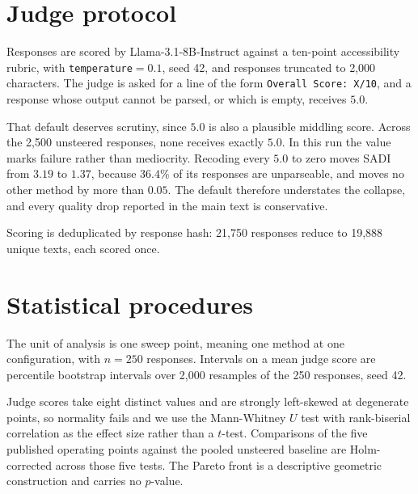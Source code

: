 
\section{Judge protocol}
\label{app:judge}

Responses are scored by Llama-3.1-8B-Instruct against a ten-point accessibility rubric,
with \texttt{temperature}$=0.1$, seed 42, and responses truncated to 2{,}000 characters.
The judge is asked for a line of the form \texttt{Overall Score: X/10}, and a response
whose output cannot be parsed, or which is empty, receives $5.0$.

That default deserves scrutiny, since $5.0$ is also a plausible middling score. Across
the 2{,}500 unsteered responses, none receives exactly $5.0$. In this run the value marks
failure rather than mediocrity. Recoding every $5.0$ to zero moves SADI from $3.19$ to
$1.37$, because $36.4\%$ of its responses are unparseable, and moves no other method by
more than $0.05$. The default therefore understates the collapse, and every quality drop
reported in the main text is conservative.

Scoring is deduplicated by response hash: 21{,}750 responses reduce to 19{,}888 unique
texts, each scored once.

\section{Statistical procedures}
\label{app:stats}

The unit of analysis is one sweep point, meaning one method at one configuration, with
$n{=}250$ responses. Intervals on a mean judge score are percentile bootstrap intervals
over 2{,}000 resamples of the 250 responses, seed 42.

Judge scores take eight distinct values and are strongly left-skewed at degenerate
points, so normality fails and we use the Mann-Whitney $U$ test with rank-biserial
correlation as the effect size rather than a $t$-test. Comparisons of the five published
operating points against the pooled unsteered baseline are Holm-corrected across those
five tests. The Pareto front is a descriptive geometric construction and carries no
$p$-value.

